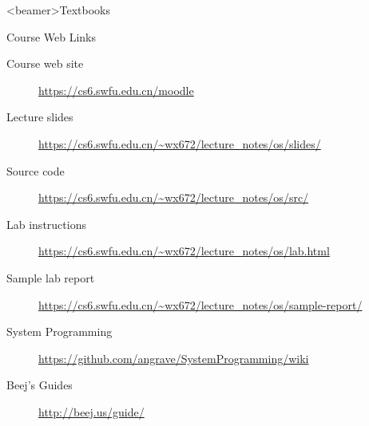 \mode*
{}


\begin{frame}<beamer>{Textbooks}
  \begin{refsection}
    \nocite{tanenbaum2008modern, silberschatz11essentials, bovet2005understanding,
      cs241}%
    \printbibliography[heading=none]
  \end{refsection}
\end{frame}

\begin{frame}{Course Web Links}
  \begin{description}
  \item[Course web site] \url{https://cs6.swfu.edu.cn/moodle}
  \item[Lecture slides] \url{https://cs6.swfu.edu.cn/~wx672/lecture_notes/os/slides/}
  \item[Source code] \url{https://cs6.swfu.edu.cn/~wx672/lecture_notes/os/src/}
  \item[Lab instructions] \url{https://cs6.swfu.edu.cn/~wx672/lecture_notes/os/lab.html}
  \item[Sample lab report] \url{https://cs6.swfu.edu.cn/~wx672/lecture_notes/os/sample-report/}
  \item[System Programming] \url{https://github.com/angrave/SystemProgramming/wiki}
  \item[Beej's Guides] \url{http://beej.us/guide/}
  \end{description}
\end{frame}

